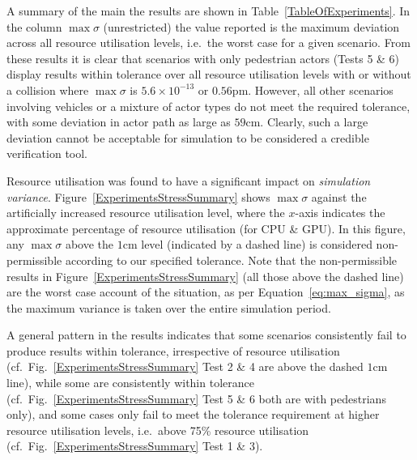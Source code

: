 \documentclass[runningheads,twocolumn,a4paper,10pt]{llncs}
\begin{document}

A summary of the main the results are shown in Table~\ref{TableOfExperiments}.  In the column $\max\sigma$ (unrestricted) the value reported is the maximum deviation across all resource utilisation levels, i.e.\ the worst case for a given scenario.  
%
From these results it is clear that scenarios with only pedestrian actors (Tests 5 \& 6) display results within tolerance over all resource utilisation levels with or without a collision where $\max\sigma$ is $5.6\times10^{-13}$ or $0.56\si{\pico\metre}$. 
%
However, all other scenarios involving vehicles or a mixture of actor types do not meet the required tolerance, with some deviation in actor path as large as $59$cm.
%
%
Clearly, such a large deviation cannot be acceptable for simulation to be considered a credible verification tool.

Resource utilisation was found to have a significant impact on \textit{simulation variance}.
%
Figure~\ref{ExperimentsStressSummary} shows $\max\sigma$ against the artificially increased resource utilisation level, where the $x$-axis indicates the approximate percentage of resource utilisation (for CPU \& GPU). In this figure, any $\max\sigma$ above the $1$cm level (indicated by a dashed line) is considered non-permissible according to our specified tolerance. 
%
Note that the non-permissible results in Figure~\ref{ExperimentsStressSummary} (all those above the dashed line) are the worst case account of the situation, as per Equation~\ref{eq:max_sigma}, as the maximum variance is taken over the entire simulation period.
%
%

A general pattern in the results indicates that some scenarios consistently fail to produce results within tolerance, irrespective of resource utilisation (cf.\ Fig.~\ref{ExperimentsStressSummary} Test 2 \& 4 are above the dashed $1$cm line), while some are consistently within tolerance (cf.\ Fig.~\ref{ExperimentsStressSummary} Test 5 \& 6 both are with pedestrians only), and some cases only fail to meet the tolerance requirement at higher resource utilisation levels, i.e.\ above 75\% resource utilisation (cf.\ Fig.~\ref{ExperimentsStressSummary} Test 1 \& 3). 
\end{document}
